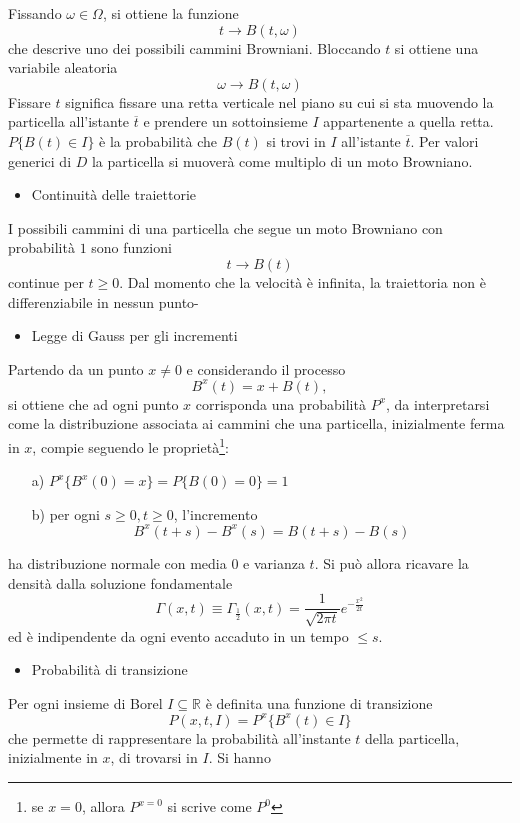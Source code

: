 \documentclass[a4paper,12pt, draft]{article}
\theoremstyle{break}
\numberwithin{equation}{section}
\begin{document}
Fissando \(\omega \in \Omega\), si ottiene la funzione
\[
  t \longrightarrow B(t, \omega)
\]
che descrive uno dei possibili cammini Browniani. Bloccando \(t\) si ottiene una variabile aleatoria
\[
  \omega \longrightarrow B(t, \omega)
\]
Fissare \(t\) significa fissare una retta verticale nel piano su cui si sta muovendo la particella all'istante \(\overline{t}\) e prendere un sottoinsieme \(I\) appartenente a quella retta. \(P\{B(t) \in I\}\) è la probabilità che \(B(t)\) si trovi in \(I\) all'istante \(\overline{t}\).
Per valori generici di \(D\) la particella si muoverà come multiplo di un moto Browniano. 
\begin{itemize}
  \item Continuità delle traiettorie
\end{itemize}
I possibili cammini di una particella che segue un moto Browniano con probabilità \(1\) sono funzioni 
\[
  t \longrightarrow B(t) 
\]
continue per \(t \geq 0\). Dal momento che la velocità è infinita, la traiettoria non è differenziabile in nessun punto-
\begin{itemize}
  \item Legge di Gauss per gli incrementi
\end{itemize}
Partendo da un punto \(x \not = 0\) e considerando il processo
\[
  B^x(t) = x + B(t),
\]
si ottiene che ad ogni punto \(x\) corrisponda una probabilità \(P^x\), da interpretarsi come la distribuzione associata ai cammini che una particella, inizialmente ferma in \(x\), compie seguendo le proprietà\footnote{se \(x = 0\), allora \(P^{x=0}\) si scrive come \(P^0\)}:
\begin{itemize}
  \item [a)] \(P^x\{B^x(0) =x\} = P\{B(0) = 0\} = 1\)
  \item [b)] per ogni \(s\geq 0, t \geq 0\), l'incremento 
  \[
  B^x(t+s) -B^x(s) = B(t+s) - B(s) 
  \]
\end{itemize}
ha distribuzione normale con media \(0\) e varianza \(t\). Si può allora ricavare la densità dalla soluzione fondamentale
\[
  \Gamma(x,t) \equiv \Gamma_{\frac{1}{2}}(x,t) = \frac{1}{\sqrt{2\pi t}}e^{-\frac{x^2}{2t}}
\]
ed è indipendente da ogni evento accaduto in un tempo  \(\leq s\).
\begin{itemize}
  \item Probabilità di transizione 
\end{itemize}
Per ogni insieme di Borel \(I \subseteq \mathbb{R}\) è definita una funzione di transizione
\[
  P(x,t,I) = P^x\{B^x(t)\in I\} 
\]
che permette di rappresentare la probabilità all'instante \(t\) della particella, inizialmente in \(x\), di trovarsi in \(I\). Si hanno
\end{document}
